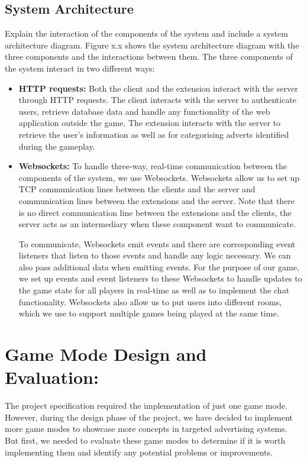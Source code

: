 \documentclass{l4proj}
\begin{document}
\subsection{System Architecture}
Explain the interaction of the components of the system and include a system architecture diagram.
Figure x.x shows the system architecture diagram with the three components and the interactions between them. The three components of the system interact in two different ways:
\begin{itemize}
   \item
   \textbf{HTTP requests:} Both the client and the extension interact with the server through HTTP requests. The client interacts with the server to authenticate users, retrieve database data and handle any functionality of the web application outside the game. The extension interacts with the server to retrieve the user's information as well as for categorising adverts identified during the gameplay.
   \item
   \textbf{Websockets:} To handle three-way, real-time communication between the components of the system, we use Websockets. Websockets allow us to set up TCP communication lines between the clients and the server and communication lines between the extensions and the server. Note that there is no direct communication line between the extensions and the clients, the server acts as an intermediary when these component want to communicate. 

To communicate, Websockets emit events and there are corresponding event listeners that listen to those events and handle any logic necessary. We can also pass additional data when emitting events. For the purpose of our game, we set up events and event listeners to these Websockets to handle updates to the game state for all players in real-time as well as to implement the chat functionality. Websockets also allow us to put users into different rooms, which we use to support multiple games being played at the same time.
\end{itemize}

\section{Game Mode Design and Evaluation:}
The project specification required the implementation of just one game mode. However, during the design phase of the project, we have decided to implement more game modes to showcase more concepts in targeted advertising systems. But first, we needed to evaluate these game modes to determine if it is worth implementing them and identify any potential problems or improvements.
\end{document}
